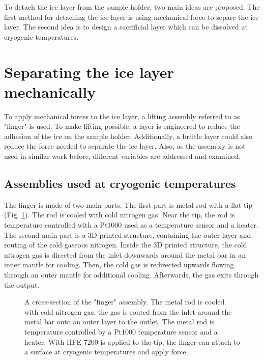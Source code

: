 
To detach the ice layer from the sample holder, two main ideas are proposed. The first method for detaching the ice layer is using mechanical force to separe the ice layer. The second idea is to design a sacrificial layer which can be dissolved at cryogenic temperatures.

\section{Separating the ice layer mechanically}

To apply mechanical forces to the ice layer, a lifting assembly referred to as "finger" is used. To make lifting possible, a layer is engineered to reduce the adhesion of the ice on the sample holder. Additionally, a brittle layer could also reduce the force needed to separate the ice layer. Also, as the assembly is not used in similar work before, different variables are addressed and examined.  

\subsection{Assemblies used at cryogenic temperatures}

The finger is made of two main parts. The first part is metal rod with a flat tip (Fig. \ref{fig:querschnittfinger}). The rod is cooled with cold nitrogen gas. Near the tip, the rod is temperature controlled with a Pt1000 used as a temperature sensor and a heater. The second main part is a 3D printed structure, containing the outer layer and routing of the cold gaseous nitrogen. Inside the 3D printed structure, the cold nitrogen gas is directed from the inlet downwards around the metal bar in an inner mantle for cooling. Then, the cold gas is redirected upwards flowing through an outer mantle for additional cooling. Afterwards, the gas exits through the output.

\begin{figure}[hbt!]
	\centering
	
	\caption{A cross-section of the "finger" assembly. The metal rod is cooled with cold nitrogen gas. the gas is routed from the inlet around the metal bar onto an outer layer to the outlet. The metal rod is temperature controlled by a Pt1000 temperature sensor and a heater. With HFE 7200 is applied to the tip, the finger can attach to a surface at cryogenic temperatures and apply force. }
	\label{fig:querschnittfinger}
\end{figure}

